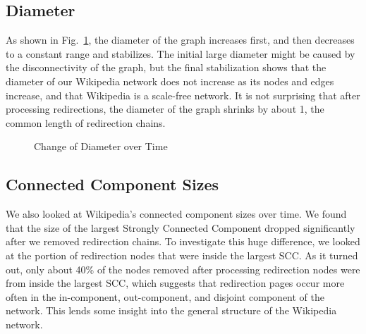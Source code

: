 \documentclass[10pt]{article}
\begin{document}
\begin{multicols}{2}
\subsection{Diameter}
As shown in Fig.~\ref{fig:diameter}, the diameter of the graph increases first, and then decreases to a constant range and stabilizes. The initial large diameter might be caused by the disconnectivity of the graph, but the final stabilization shows that the diameter of our Wikipedia network does not increase as its nodes and edges increase, and that Wikipedia is a scale-free network. It is not surprising that after processing redirections, the diameter of the graph shrinks by about 1, the common length of redirection chains.

\begin{figure}[H]
\caption{Change of Diameter over Time\label{fig:diameter}}
\end{figure}

\subsection{Connected Component Sizes}
We also looked at Wikipedia's connected component sizes over time. We found that the size of the largest Strongly Connected Component dropped significantly after we removed redirection chains. To investigate this huge difference, we looked at the portion of redirection nodes that were inside the largest SCC. As it turned out, only about 40\% of the nodes removed after processing redirection nodes were from inside the largest SCC, which suggests that redirection pages occur more often in the in-component, out-component, and disjoint component of the network. This lends some insight into the general structure of the Wikipedia network.


\end{multicols}
\end{document}

